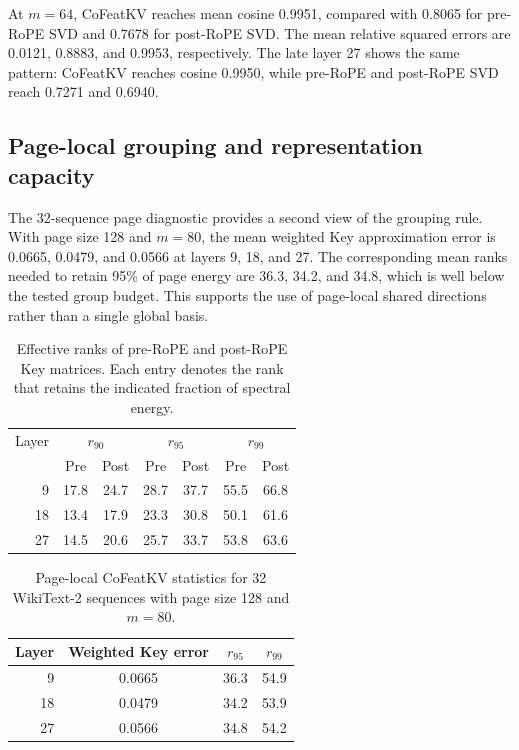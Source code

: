 \documentclass{article} %
\begin{document}
At $m=64$, CoFeatKV reaches mean cosine 0.9951, compared with 0.8065 for
pre-RoPE SVD and 0.7678 for post-RoPE SVD. The mean relative squared errors
are 0.0121, 0.8883, and 0.9953, respectively. The late layer 27 shows the
same pattern: CoFeatKV reaches cosine 0.9950, while pre-RoPE and post-RoPE
SVD reach 0.7271 and 0.6940.
\fi

\subsection{Page-local grouping and representation capacity}

The 32-sequence page diagnostic provides a second view of the grouping rule.
With page size 128 and $m=80$, the mean weighted Key approximation error is
0.0665, 0.0479, and 0.0566 at layers 9, 18, and 27. The corresponding mean
ranks needed to retain 95\% of page energy are 36.3, 34.2, and 34.8, which is
well below the tested group budget. This supports the use of page-local shared
directions rather than a single global basis.

\begin{table}[H]
\centering
\caption{Effective ranks of pre-RoPE and post-RoPE Key matrices. Each entry
denotes the rank that retains the indicated fraction of spectral energy.}
\label{tab:effective-rank}
\small
\setlength{\tabcolsep}{5pt}
\begin{tabular}{rcccccc}
\toprule
Layer & \multicolumn{2}{c}{$r_{90}$} & \multicolumn{2}{c}{$r_{95}$} & \multicolumn{2}{c}{$r_{99}$} \\
 & Pre & Post & Pre & Post & Pre & Post \\
\midrule
9  & 17.8 & 24.7 & 28.7 & 37.7 & 55.5 & 66.8 \\
18 & 13.4 & 17.9 & 23.3 & 30.8 & 50.1 & 61.6 \\
27 & 14.5 & 20.6 & 25.7 & 33.7 & 53.8 & 63.6 \\
\bottomrule
\end{tabular}
\end{table}

\begin{table}[H]
\centering
\caption{Page-local CoFeatKV statistics for 32 WikiText-2 sequences with
page size 128 and $m=80$.}
\label{tab:group-summary}
\small
\setlength{\tabcolsep}{6pt}
\begin{tabular}{rccc}
\toprule
Layer & Weighted Key error & $r_{95}$ & $r_{99}$ \\
\midrule
9  & 0.0665 & 36.3 & 54.9 \\
18 & 0.0479 & 34.2 & 53.9 \\
27 & 0.0566 & 34.8 & 54.2 \\
\bottomrule
\end{tabular}
\end{table}
\end{document}
